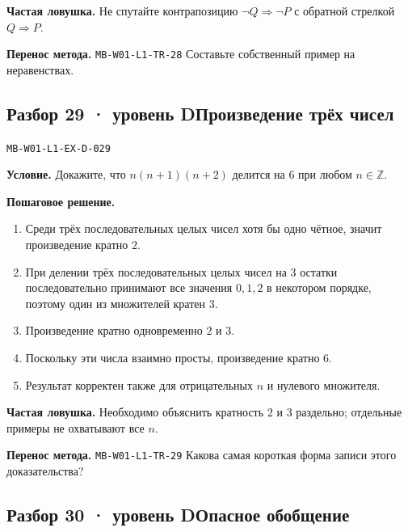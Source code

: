 \documentclass[11pt,a4paper,openany]{book}
\newcommand{\mtag}[1]{\textsf{\small\color{mbaccent}\bfseries #1}}
\newcommand{\muid}[1]{\texttt{\footnotesize #1}}
\begin{document}
\begin{learnbox}\textbf{Частая ловушка.} Не спутайте контрапозицию $\neg Q\Rightarrow\neg P$ с обратной стрелкой $Q\Rightarrow P$.\par \textbf{Перенос метода.} \muid{MB-W01-L1-TR-28} Составьте собственный пример на неравенствах.\end{learnbox}

\subsection*{\mtag{Разбор 29 · уровень D}\quad Произведение трёх чисел}\hypertarget{MB-W01-L1-EX-D-029}{}

\muid{MB-W01-L1-EX-D-029}\par

\begin{keybox}\textbf{Условие.} Докажите, что $n(n+1)(n+2)$ делится на $6$ при любом $n\in\mathbb Z$.\end{keybox}

\textbf{Пошаговое решение.}\par
\begin{enumerate}[label=\arabic*),leftmargin=*,itemsep=3pt,topsep=4pt]
\item Среди трёх последовательных целых чисел хотя бы одно чётное, значит произведение кратно $2$.
\item При делении трёх последовательных целых чисел на $3$ остатки последовательно принимают все значения $0,1,2$ в некотором порядке, поэтому один из множителей кратен $3$.
\item Произведение кратно одновременно $2$ и $3$.
\item Поскольку эти числа взаимно просты, произведение кратно $6$.
\item Результат корректен также для отрицательных $n$ и нулевого множителя.
\end{enumerate}


\begin{learnbox}\textbf{Частая ловушка.} Необходимо объяснить кратность $2$ и $3$ раздельно; отдельные примеры не охватывают все $n$.\par \textbf{Перенос метода.} \muid{MB-W01-L1-TR-29} Какова самая короткая форма записи этого доказательства?\end{learnbox}

\subsection*{\mtag{Разбор 30 · уровень D}\quad Опасное обобщение}\hypertarget{MB-W01-L1-EX-D-030}{}
\end{document}
